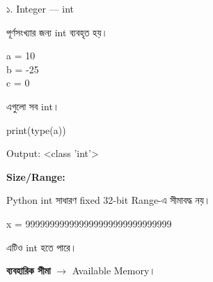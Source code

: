 \noindent
\begin{minipage}[t]{0.49\linewidth}

\begin{examplebox}{১. Integer — \textenglish{\ttfamily int}}

পূর্ণসংখ্যার জন্য
\textenglish{\ttfamily int}
ব্যবহৃত হয়।

\begin{codebox}
\begin{english}
\ttfamily
a = 10\\
b = -25\\
c = 0
\end{english}
\end{codebox}

এগুলো সব
\textenglish{\ttfamily int}।

\begin{codebox}
\begin{english}
\ttfamily
print(type(a))
\end{english}
\end{codebox}

Output:
\textenglish{\ttfamily \textless class 'int'\textgreater}

\medskip

\textbf{Size/Range:}

Python
\textenglish{\ttfamily int}
সাধারণ fixed 32-bit Range-এ সীমাবদ্ধ নয়।

\begin{codebox}
\begin{english}
\ttfamily
x = 999999999999999999999999999999
\end{english}
\end{codebox}

এটিও
\textenglish{\ttfamily int}
হতে পারে।

\textbf{ব্যবহারিক সীমা}
\(\longrightarrow\)
Available Memory।

\end{examplebox}

\end{minipage}
\hfill
